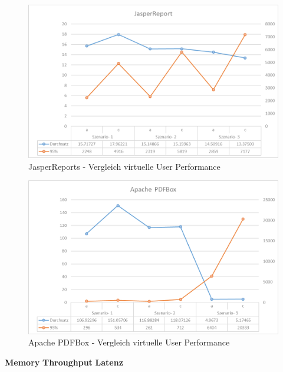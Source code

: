 \documentclass[main.tex]{subfiles}
\begin{document}
\begin{figure}[h]
\includegraphics[width=\textwidth/2]{mainpart/4_analyse_img/Jasper_ac.png}
 \caption{JasperReports - Vergleich virtuelle User Performance }
 \label{figure:vglVUjasper}
\end{figure}

\begin{figure}[h]
\includegraphics[width=\textwidth/2]{mainpart/4_analyse_img/PdfBox_ac.png}
  \caption{Apache PDFBox - Vergleich virtuelle User Performance}
 \label{figure:vglVUPdfBox}
\end{figure}



\textbf{Memory}
\textbf{Throughput}
\textbf{Latenz}
\end{document}

